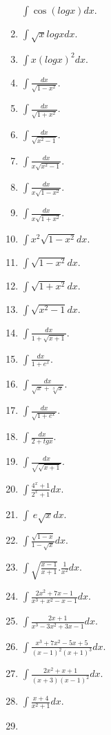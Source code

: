 \documentclass[12pt,]{article}
\begin{document}
\begin{enumerate}
  \(\displaystyle\int\cos(log x)dx.\)
\item
  \(\displaystyle\int \sqrt{x}log x dx.\)
\item
  \(\displaystyle\int x(log x)^2dx.\)
\item
  \(\displaystyle\int\frac{dx}{\sqrt{1-x^2}}.\)
\item
  \(\displaystyle\int\frac{dx}{\sqrt{1+x^2}}.\)
\item
  \(\displaystyle\int\frac{dx}{\sqrt{x^2-1}}.\)
\item
  \(\displaystyle\int\frac{dx}{x\sqrt{x^2-1}}.\)
\item
  \(\displaystyle\int\frac{dx}{x\sqrt{1-x^2}}.\)
\item
  \(\displaystyle\int\frac{dx}{x\sqrt{1+x^2}}.\)
\item
  \(\displaystyle\int x^2\sqrt{1-x^2}dx.\)
\item
  \(\displaystyle\int\sqrt{1-x^2}dx.\)
\item
  \(\displaystyle\int\sqrt{1+x^2}dx.\)
\item
  \(\displaystyle\int\sqrt{x^2-1}dx.\)
\item
  \(\displaystyle\int\frac{dx}{1+\sqrt{x+1}}.\)
\item
  \(\displaystyle\int\frac{dx}{1+e^x}.\)
\item
  \(\displaystyle\int\frac{dx}{\sqrt{x}+\sqrt[3]x}.\)
\item
  \(\displaystyle\int\frac{dx}{\sqrt{1+e^x}}.\)
\item
  \(\displaystyle\int\frac{dx}{2+tgx}.\)
\item
  \(\displaystyle\int\frac{dx}{\sqrt{\sqrt{x+1}}}.\)
\item
  \(\displaystyle\int\frac{4^x+1}{2^x+1}dx.\)
\item
  \(\displaystyle\int\ e\sqrt{x}dx.\)
\item
  \(\displaystyle\int\frac{\sqrt{1-x}}{1-\sqrt{x}}dx.\)
\item
  \(\displaystyle\int\sqrt{\frac{x-1}{x+1}}.\frac{1}{x^2}dx.\)
\item
  \(\displaystyle\int\frac{2x^2+7x-1}{x^3+x^2-x-1}dx.\)
\item
  \(\displaystyle\int\frac{2x+1}{x^3-3x^2+3x-1}dx.\)
\item
  \(\displaystyle\int\frac{x^3+7x^2-5x+5}{(x-1)^2(x+1)^3}dx.\)
\item
  \(\displaystyle\int\frac{2x^2+x+1}{(x+3)(x-1)^2}dx.\)
\item
  \(\displaystyle\int\frac{x+4}{x^2+1}dx.\)
\item

\end{enumerate}
\end{document}
